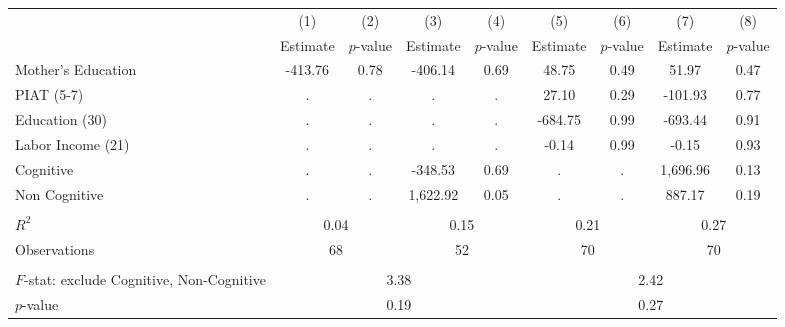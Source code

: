 \begin{tabular}{lcccccccc} \toprule
 & (1) & (2) & (3) & (4) & (5) & (6) & (7) & (8) \\
 & Estimate & $p$-value & Estimate & $p$-value  & Estimate & $p$-value  & Estimate & $p$-value  \\ \midrule 
Mother's Education &      -413.76 &         0.78 &      -406.14 &         0.69 &        48.75 &         0.49 &        51.97 &         0.47 \\  
PIAT (5-7) &            . &            . &            . &            . &        27.10 &         0.29 &      -101.93 &         0.77 \\  
Education (30) &            . &            . &            . &            . &      -684.75 &         0.99 &      -693.44 &         0.91 \\  
Labor Income (21) &            . &            . &            . &            . &        -0.14 &         0.99 &        -0.15 &         0.93 \\  
Cognitive &            . &            . &      -348.53 &         0.69 &            . &            . &     1,696.96 &         0.13 \\  
Non Cognitive &            . &            . &     1,622.92 &         0.05 &            . &            . &       887.17 &         0.19 \\  \\ \midrule 
$R^2$ &          \multicolumn{2}{c}{0.04} &             \multicolumn{2}{c}{0.15} &            \multicolumn{2}{c}{0.21} &              \multicolumn{2}{c}{0.27}   \\  
Observations &         \multicolumn{2}{c}{68} &                 \multicolumn{2}{c}{52} &               \multicolumn{2}{c}{70}  &                \multicolumn{2}{c}{70}   \\  \\ \midrule
$F$-stat: exclude Cognitive, Non-Cognitive  &                 \multicolumn{4}{c}{3.38} &              \multicolumn{4}{c}{2.42}  \\  
$p$-value &                \multicolumn{4}{c}{0.19} &               \multicolumn{4}{c}{0.27}  \\      \bottomrule \end{tabular}